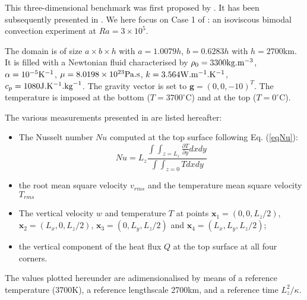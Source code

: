 
This three-dimensional benchmark was first proposed by \cite{bucc93}. 
It has been subsequently presented in \cite{tack94,trha98,albe00,omma06,dawk11,krhb12}.
We here focus on Case 1 of \cite{bucc93}:  an isoviscous bimodal convection experiment at $Ra=3\times 10^5$.

The domain is of size $a\times b\times h$ with $a=1.0079h$, $b=0.6283h$ with $h=2700$km. It is filled with a Newtonian fluid
characterised by $\rho_0=3300{\rm kg}.{\rm m}^{-3}$, $\alpha=10^{-5}{\rm K}^{-1}$, $\mu=8.0198\times10^{23}{\rm Pa.s}$, 
$k=3.564{\rm W}.{\rm m}^{-1}.{\rm K}^{-1}$, 
$c_p=1080{\rm J}.{\rm K}^{-1}.{\rm kg}^{-1}$.
The gravity vector is set to ${\bm g}=(0,0,-10)^T$.
The temperature is imposed at the bottom  ($T=3700^\circ$C) and at the top ($T=0^\circ$C).

The various measurements presented in \cite{bucc93} are listed hereafter:
\begin{itemize}
\item The Nusselt number $Nu$ computed at the top surface following Eq. (\ref{eqNu}):
\[
Nu = L_z \frac{\int\int_{z=L_z} \frac{\partial T}{\partial y} dx dy  }{\int \int_{z=0} T dx dy}
\]
\item the root mean square velocity $v_{rms}$ and the temperature mean square velocity $T_{rms}$
\item The vertical velocity $w$ and temperature $T$ at points ${\bm x}_1=(0,0,L_z/2)$, ${\bm x}_2=(L_x,0,L_z/2)$,
${\bm x}_3=(0,L_y,L_z/2)$ and ${\bm x}_4=(L_x,L_y,L_z/2)$;
\item the vertical component of the heat flux $Q$ at the top surface  at all four corners.
\end{itemize}

The values plotted hereunder are adimensionalised by means of a reference temperature (3700K),
a reference lengthscale 2700km, and a reference time $L_z^2/\kappa$. 





